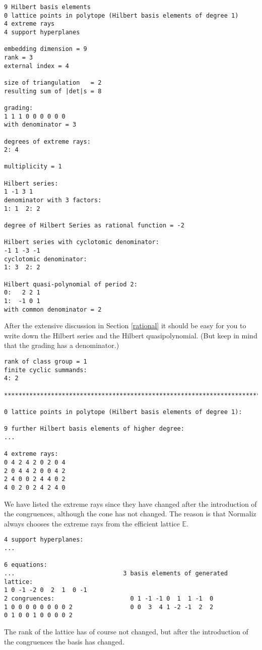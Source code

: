 \documentclass[12pt,a4paper]{scrartcl}
\theoremstyle{definition}
\def\EE{{\mathbb E}}
\begin{document}
\begin{Verbatim}
9 Hilbert basis elements
0 lattice points in polytope (Hilbert basis elements of degree 1)
4 extreme rays
4 support hyperplanes

embedding dimension = 9
rank = 3
external index = 4

size of triangulation   = 2
resulting sum of |det|s = 8

grading:
1 1 1 0 0 0 0 0 0 
with denominator = 3

degrees of extreme rays:
2: 4  

multiplicity = 1

Hilbert series:
1 -1 3 1 
denominator with 3 factors:
1: 1  2: 2  

degree of Hilbert Series as rational function = -2

Hilbert series with cyclotomic denominator:
-1 1 -3 -1 
cyclotomic denominator:
1: 3  2: 2  

Hilbert quasi-polynomial of period 2:
0:   2 2 1
1:  -1 0 1
with common denominator = 2
\end{Verbatim}
After the extensive discussion in Section \ref{rational} it should be easy for you to write down the Hilbert series and the Hilbert quasipolynomial. (But keep in mind that the grading has a denominator.)
\begin{Verbatim}
rank of class group = 1
finite cyclic summands:
4: 2  

***********************************************************************

0 lattice points in polytope (Hilbert basis elements of degree 1):

9 further Hilbert basis elements of higher degree:
...

4 extreme rays:
0 4 2 4 2 0 2 0 4
2 0 4 4 2 0 0 4 2
2 4 0 0 2 4 4 0 2
4 0 2 0 2 4 2 4 0
\end{Verbatim}
We have listed the extreme rays since they have changed after the introduction of the congruences, although the cone has not changed. The reason is that Normaliz always chooses the extreme rays from the efficient lattice $\EE$.
\begin{Verbatim}
4 support hyperplanes:
...

6 equations:
...                              3 basis elements of generated lattice:
1 0 -1 -2 0  2  1  0 -1
2 congruences:                     0 1 -1 -1 0  1  1 -1  0
1 0 0 0 0 0 0 0 0 2                0 0  3  4 1 -2 -1  2  2
0 1 0 0 1 0 0 0 0 2
\end{Verbatim}
The rank of the lattice has of course not changed, but after the introduction of the congruences the basis has changed.
\end{document}

